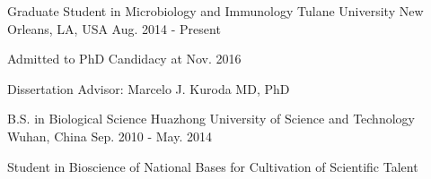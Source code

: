 

\begin{cventries}

  \cventry
    {Graduate Student in Microbiology and Immunology} %
    {Tulane University } %
    {New Orleans, LA, USA} %
    {Aug. 2014 - Present} %
    {
      \begin{cvitems} %
        \item {Admitted to PhD Candidacy at Nov. 2016}
        \item {Dissertation Advisor: Marcelo J. Kuroda MD, PhD}
      \end{cvitems}
    }
\cventry
    {B.S. in Biological Science} %
    {Huazhong University of Science and Technology} %
    {Wuhan, China} %
    {Sep. 2010 - May. 2014} %
    {
      \begin{cvitems} %
        \item {Student in Bioscience of National Bases for Cultivation of Scientific Talent}
      \end{cvitems}
    }
\end{cventries}
